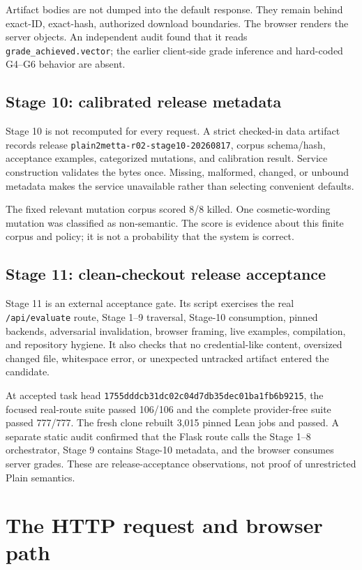 \documentclass[11pt]{article}
\newcommand{\code}[1]{\texttt{#1}}
\begin{document}
Artifact bodies are not dumped into the default response.  They remain behind
exact-ID, exact-hash, authorized download boundaries.  The browser renders the
server objects.  An independent audit found that it reads
\code{grade\_achieved.vector}; the earlier client-side grade inference and
hard-coded G4--G6 behavior are absent.

\subsection{Stage 10: calibrated release metadata}

Stage 10 is not recomputed for every request.  A strict checked-in data
artifact records release \code{plain2metta-r02-stage10-20260817}, corpus
schema/hash, acceptance examples, categorized mutations, and calibration
result.  Service construction validates the bytes once.  Missing, malformed,
changed, or unbound metadata makes the service unavailable rather than
selecting convenient defaults.

The fixed relevant mutation corpus scored 8/8 killed.  One cosmetic-wording
mutation was classified as non-semantic.  The score is evidence about this
finite corpus and policy; it is not a probability that the system is correct.

\subsection{Stage 11: clean-checkout release acceptance}

Stage 11 is an external acceptance gate.  Its script exercises the real
\code{/api/evaluate} route, Stage 1--9 traversal, Stage-10 consumption, pinned
backends, adversarial invalidation, browser framing, live examples,
compilation, and repository hygiene.  It also checks that no credential-like
content, oversized changed file, whitespace error, or unexpected untracked
artifact entered the candidate.

At accepted task head
\code{1755dddcb31dc02c04d7db35dec01ba1fb6b9215}, the focused real-route suite
passed 106/106 and the complete provider-free suite passed 777/777.  The fresh
clone rebuilt 3,015 pinned Lean jobs and passed.  A separate static audit
confirmed that the Flask route calls the Stage 1--8 orchestrator, Stage 9
contains Stage-10 metadata, and the browser consumes server grades.  These are
release-acceptance observations, not proof of unrestricted Plain semantics.

\section{The HTTP request and browser path}
\end{document}
